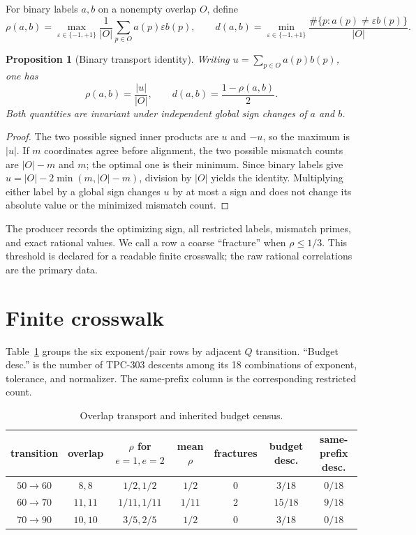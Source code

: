 \documentclass[11pt]{article}
\newtheorem{proposition}{Proposition}
\begin{document}
For binary labels $a,b$ on a nonempty overlap $O$, define
\[
 \rho(a,b)=\max_{\varepsilon\in\{-1,+1\}}
       \frac{1}{|O|}\sum_{p\in O}a(p)\varepsilon b(p),
 \qquad
 d(a,b)=\min_{\varepsilon\in\{-1,+1\}}
       \frac{\#\{p:a(p)\ne\varepsilon b(p)\}}{|O|}.
\]

\begin{proposition}[Binary transport identity]
Writing $u=\sum_{p\in O}a(p)b(p)$, one has
\[
 \rho(a,b)=\frac{|u|}{|O|},\qquad
 d(a,b)=\frac{1-\rho(a,b)}{2}.
\]
Both quantities are invariant under independent global sign changes of $a$
and $b$.
\end{proposition}

\begin{proof}
The two possible signed inner products are $u$ and $-u$, so the maximum is
$|u|$.  If $m$ coordinates agree before alignment, the two possible mismatch
counts are $|O|-m$ and $m$; the optimal one is their minimum.  Since binary
labels give $u=|O|-2\min(m,|O|-m)$, division by $|O|$ yields the identity.
Multiplying either label by a global sign changes $u$ by at most a sign and
does not change its absolute value or the minimized mismatch count.
\end{proof}

The producer records the optimizing sign, all restricted labels, mismatch
primes, and exact rational values.  We call a row a coarse ``fracture'' when
$\rho\le 1/3$.  This threshold is declared for a readable finite crosswalk;
the raw rational correlations are the primary data.

\section{Finite crosswalk}

Table~\ref{tab:crosswalk} groups the six exponent/pair rows by adjacent
$Q$ transition.  ``Budget desc.'' is the number of TPC-303 descents among its
18 combinations of exponent, tolerance, and normalizer.  The same-prefix
column is the corresponding restricted count.

\begin{table}[t]
\centering\small
\caption{Overlap transport and inherited budget census.}
\label{tab:crosswalk}
\begin{tabular}{c c c c c c c}
\toprule
transition & overlap & $\rho$ for $e=1,e=2$ & mean $\rho$ & fractures
& budget desc. & same-prefix desc.\\
\midrule
$50\to60$ & $8,8$ & $1/2,1/2$ & $1/2$ & $0$ & $3/18$ & $0/18$\\
$60\to70$ & $11,11$ & $1/11,1/11$ & $1/11$ & $2$ & $15/18$ & $9/18$\\
$70\to90$ & $10,10$ & $3/5,2/5$ & $1/2$ & $0$ & $3/18$ & $0/18$\\
\bottomrule
\end{tabular}
\end{table}
\end{document}
